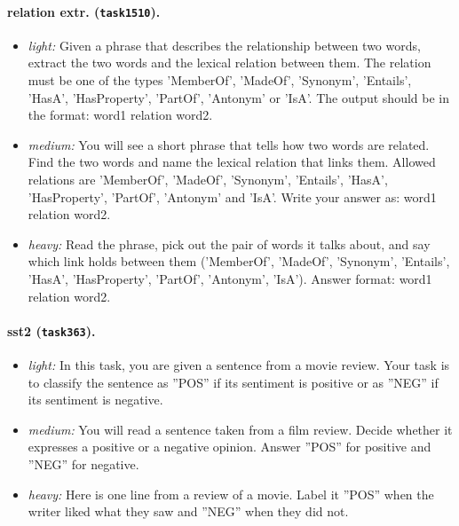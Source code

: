 \paragraph{relation extr. (\texttt{task1510}).}
\begin{itemize}
  \item \emph{light:} Given a phrase that describes the relationship between two words, extract the two words and the lexical relation between them. The relation must be one of the types 'MemberOf', 'MadeOf', 'Synonym', 'Entails', 'HasA', 'HasProperty', 'PartOf', 'Antonym' or 'IsA'. The output should be in the format: word1 relation word2.
  \item \emph{medium:} You will see a short phrase that tells how two words are related. Find the two words and name the lexical relation that links them. Allowed relations are 'MemberOf', 'MadeOf', 'Synonym', 'Entails', 'HasA', 'HasProperty', 'PartOf', 'Antonym' and 'IsA'. Write your answer as: word1 relation word2.
  \item \emph{heavy:} Read the phrase, pick out the pair of words it talks about, and say which link holds between them ('MemberOf', 'MadeOf', 'Synonym', 'Entails', 'HasA', 'HasProperty', 'PartOf', 'Antonym', 'IsA'). Answer format: word1 relation word2.
\end{itemize}
\paragraph{sst2 (\texttt{task363}).}
\begin{itemize}
  \item \emph{light:} In this task, you are given a sentence from a movie review. Your task is to classify the sentence as ''POS'' if its sentiment is positive or as ''NEG'' if its sentiment is negative.
  \item \emph{medium:} You will read a sentence taken from a film review. Decide whether it expresses a positive or a negative opinion. Answer ''POS'' for positive and ''NEG'' for negative.
  \item \emph{heavy:} Here is one line from a review of a movie. Label it ''POS'' when the writer liked what they saw and ''NEG'' when they did not.
\end{itemize}
